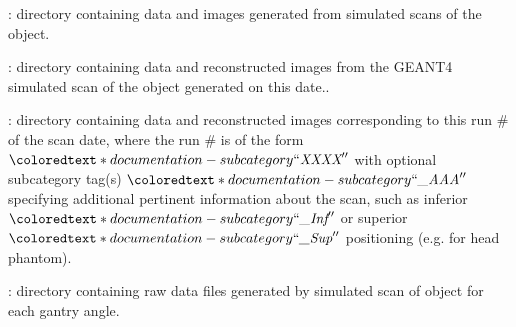 \begin{tcbfunctionenv}
\begin{tcbparagraph}
\begin{deepList}[labelindent=1pt, leftmargin=*]
\begin{deepList}[labelindent=1pt, leftmargin=*]
\begin{deepList}[labelindent=1pt, leftmargin=*]
\begin{deepList}[labelindent=1pt, leftmargin=*]
\begin{deepList}[labelindent=1pt, leftmargin=*]
\begin{deepList}[labelindent=1pt, leftmargin=*]
\begin{deepList}[labelindent=1pt, leftmargin=*]
\begin{deepList}[labelindent=1pt, leftmargin=*]
\begin{deepList}[labelindent=1pt, leftmargin=*]
\begin{deepList}[labelindent=1pt, leftmargin=*]
                                        \end{deepList}%
                                    \end{deepList}%
                                \end{deepList}%
                            \end{deepList}%
                        \end{deepList}%
                    \end{deepList}%
                \end{deepList}%
            \end{deepList}%
            \item {} : directory containing data and images generated from simulated scans of the object.
            \begin{deepList}[labelindent=1pt, leftmargin=*]
                \item {} : directory containing data and reconstructed images from the GEANT4 simulated scan of the object generated on this date..
                \begin{deepList}[labelindent=1pt, leftmargin=*]
                    \item {} : directory containing data and reconstructed images corresponding to this run \# of the scan date, where the run \# is of the form $\coloredtext*{documentation-subcategory}{``\textit{XXXX}''}$ with optional subcategory tag(s) $\coloredtext*{documentation-subcategory}{``\textit{\_AAA}''}$ specifying additional pertinent information about the scan, such as inferior $\coloredtext*{documentation-subcategory}{``\textit{\_Inf}''}$ or superior $\coloredtext*{documentation-subcategory}{``\textit{\_Sup}''}$ positioning (e.g. for head phantom).
                    \begin{deepList}[labelindent=1pt, leftmargin=*]
                        \item {} : directory containing raw data files generated by simulated scan of object for each gantry angle.
                        \begin{deepList}[labelindent=1pt, leftmargin=*]

\end{deepList}
\end{deepList}
\end{deepList}
\end{deepList}
\end{deepList}
\end{deepList}
\end{tcbparagraph}
\end{tcbfunctionenv}

